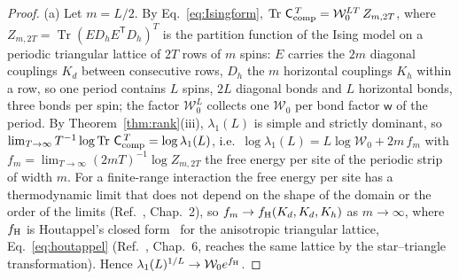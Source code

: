 \documentclass[aps,prx,reprint,superscriptaddress,nobibnotes,longbibliography]{revtex4-2}
\theoremstyle{remark}
\newcommand{\Tr}{\operatorname{Tr}}
\newcommand{\Ccomp}{\mathsf C_{\rm comp}}
\begin{document}
\begin{proof}
(a) Let $m=L/2$.  By Eq.~\eqref{eq:Isingform}, $\Tr\,\Ccomp^{\,T}=\mathcal W_0^{LT}\,Z_{m,2T}$, where $Z_{m,2T}=\Tr(ED_hE^{\mathsf T}D_h)^T$ is the partition function of the Ising model on a periodic triangular lattice of $2T$ rows of $m$ spins: $E$ carries the $2m$ diagonal couplings $K_d$ between consecutive rows, $D_h$ the $m$ horizontal couplings $K_h$ within a row, so one period contains $L$ spins, $2L$ diagonal bonds and $L$ horizontal bonds, three bonds per spin; the factor $\mathcal W_0^{L}$ collects one $\mathcal W_0$ per bond factor $\mathsf w$ of the period.  By Theorem~\ref{thm:rank}(iii), $\lambda_1(L)$ is simple and strictly dominant, so $\lim_{T\to\infty}T^{-1}\log\Tr\,\Ccomp^{\,T}=\log\lambda_1(L)$, i.e.\ $\log\lambda_1(L)=L\log\mathcal W_0+2m\,f_m$ with $f_m=\lim_{T\to\infty}(2mT)^{-1}\log Z_{m,2T}$ the free energy per site of the periodic strip of width $m$.  For a finite-range interaction the free energy per site has a thermodynamic limit that does not depend on the shape of the domain or the order of the limits (Ref.~\cite{Ruelle1969}, Chap.~2), so $f_m\to f_{\rm H}(K_d,K_d,K_h)$ as $m\to\infty$, where $f_{\rm H}$ is Houtappel's closed form~\cite{Houtappel1950} for the anisotropic triangular lattice, Eq.~\eqref{eq:houtappel} (Ref.~\cite{Baxter1982}, Chap.~6, reaches the same lattice by the star--triangle transformation).  Hence $\lambda_1(L)^{1/L}\to\mathcal W_0e^{f_{\rm H}}$.


\end{proof}
\end{document}
